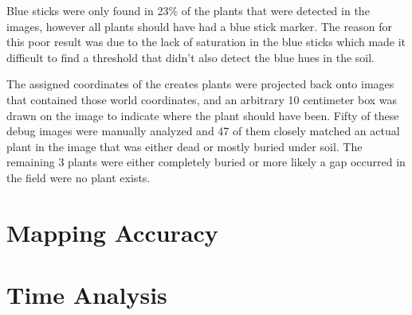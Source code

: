 Blue sticks were only found in 23\% of the plants that were detected in the images, however all plants should have had a blue stick marker.  The reason for this poor result was due to the lack of saturation in the blue sticks which made it difficult to find a threshold that didn't also detect the blue hues in the soil.  


The assigned coordinates of the creates plants were projected back onto images that contained those world coordinates, and an arbitrary 10 centimeter box was drawn on the image to indicate where the plant should have been.  Fifty of these debug images were manually analyzed and 47 of them closely matched an actual plant in the image that was either dead or mostly buried under soil.  The remaining 3 plants were either completely buried or more likely a gap occurred in the field were no plant exists.  

\section{Mapping Accuracy}


\section{Time Analysis}
